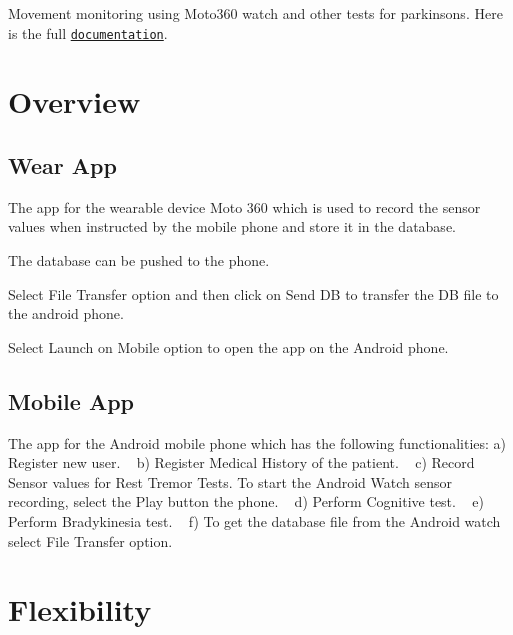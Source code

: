 Movement monitoring using Moto360 watch and other tests for parkinsons. Here is the full \href{http://htmlpreview.github.com/?https://github.com/deshmukhrajvardhan/WearableParkinsonsMonitoringSystem/blob/master/html/index.html}{\tt documentation}.

\section*{Overview}

\subsection*{Wear App}

The app for the wearable device \textquotesingle{}Moto 360\textquotesingle{} which is used to record the sensor values when instructed by the mobile phone and store it in the database. ~\newline
   

The database can be pushed to the phone. ~\newline
 

Select {\ttfamily File Transfer} option and then click on {\ttfamily Send DB} to transfer the DB file to the android phone. ~\newline
 

Select {\ttfamily Launch on Mobile} option to open the app on the Android phone. ~\newline


\subsection*{Mobile App}

The app for the Android mobile phone which has the following functionalities\+: a) Register new user. ~\newline
  b) Register Medical History of the patient. ~\newline
   c) Record Sensor values for Rest Tremor Tests. To start the Android Watch sensor recording, select the {\ttfamily Play} button the phone. ~\newline
   d) Perform Cognitive test. ~\newline
  e) Perform Bradykinesia test. ~\newline
   f) To get the database file from the Android watch select File Transfer option. ~\newline
 

\section*{Flexibility}

